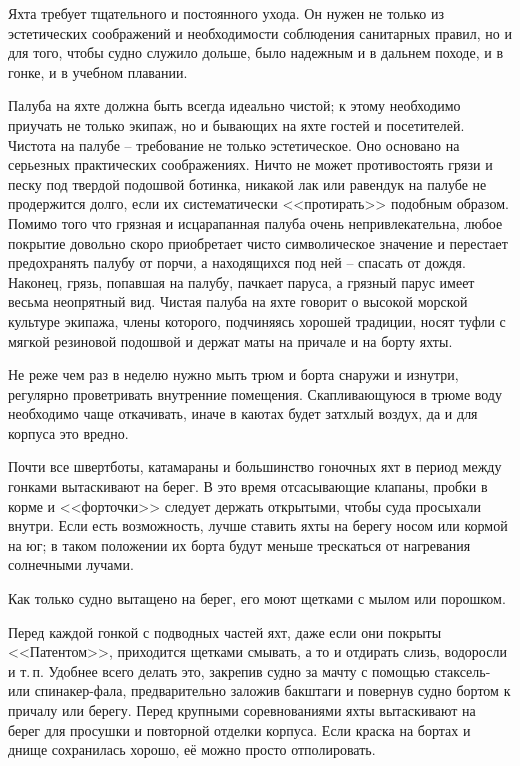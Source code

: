 \documentclass[a4paper, 12pt, twoside, final]{scrbook}
\begin{document}
Яхта требует тщательного и постоянного ухода. Он нужен не только из эстетических соображений и необходимости соблюдения санитарных правил, но и для того, чтобы судно служило дольше, было надежным и в дальнем походе, и в гонке, и в учебном плавании. 

Палуба на яхте должна быть всегда идеально чистой; к этому необходимо приучать не только экипаж, но и бывающих на яхте гостей и посетителей. Чистота на палубе \--- требование не только эстетическое. Оно основано на серьезных практических соображениях. Ничто не может противостоять грязи и песку под твердой подошвой ботинка, никакой лак или равендук на палубе не продержится долго, если их систематически <<протирать>> подобным образом. Помимо того что грязная и исцарапанная палуба очень непривлекательна, любое покрытие довольно скоро приобретает чисто символическое значение и перестает предохранять палубу от порчи, а находящихся под ней \--- спасать от дождя. Наконец, грязь, попавшая на палубу, пачкает паруса, а грязный парус имеет весьма неопрятный вид. Чистая палуба на яхте говорит о высокой морской культуре экипажа, члены которого, подчиняясь хорошей традиции, носят туфли с мягкой резиновой подошвой и держат маты на причале и на борту яхты. 

Не реже чем раз в неделю нужно мыть трюм и борта снаружи и изнутри, регулярно проветривать внутренние помещения. Скапливающуюся в трюме воду необходимо чаще откачивать, иначе в каютах будет затхлый воздух, да и для корпуса это вредно. 

Почти все швертботы, катамараны и большинство гоночных яхт в период между гонками вытаскивают на берег. В это время отсасывающие клапаны, пробки в корме и <<форточки>> следует держать открытыми, чтобы суда просыхали внутри. Если есть возможность, лучше ставить яхты на берегу носом или кормой на юг; в таком положении их борта будут меньше трескаться от нагревания солнечными лучами. 

Как только судно вытащено на берег, его моют щетками с мылом или порошком. 

Перед каждой гонкой с подводных частей яхт, даже если они покрыты <<Патентом>>, приходится щетками смывать, а то и отдирать слизь, водоросли и т.\,п. Удобнее всего делать это, закрепив судно за мачту с помощью стаксель- или спинакер-фала, предварительно заложив бакштаги и повернув судно бортом к причалу или берегу. Перед крупными соревнованиями яхты вытаскивают на берег для просушки и повторной отделки корпуса. Если краска на бортах и днище сохранилась хорошо, её можно просто отполировать. 
\end{document}
